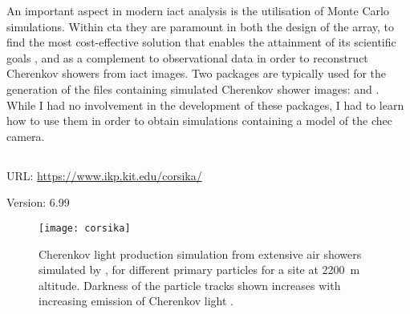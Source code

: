 An important aspect in modern \gls{iact} analysis is the utilisation of Monte Carlo simulations. Within \gls{cta} they are paramount in both the design of the array, to find the most cost-effective solution that enables the attainment of its scientific goals , and as a complement to observational data in order to reconstruct Cherenkov showers from \gls{iact} images. Two packages are typically used for the generation of the files containing simulated Cherenkov shower images:  and . While I had no involvement in the development of these packages, I had to learn how to use them in order to obtain simulations containing a model of the \gls{chec} camera.

\subsection{}
\vspace{-0.7em}
\noindent \hspace{\parindent} {\tiny URL: \url{https://www.ikp.kit.edu/corsika/} \par}
\noindent \hspace{\parindent} {\tiny Version: 6.99 \par}

\begin{figure}
  \texttt{[image: corsika]}
  \caption[ extensive air shower simulations.]{Cherenkov light production simulation from extensive air showers simulated by , for different primary particles for a site at \SI{2200}{m} altitude. Darkness of the particle tracks shown increases with increasing emission of Cherenkov light \cite{Bernlohr2008}.}
  \label{fig:corsika}
\end{figure}

